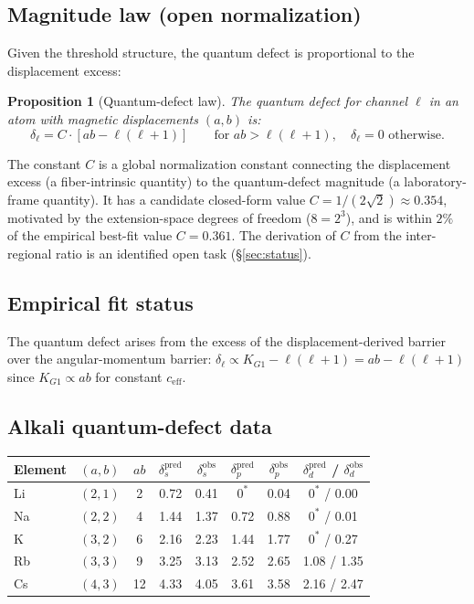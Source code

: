 \documentclass[11pt,a4paper]{article}
\newtheorem{proposition}[theorem]{Proposition}
\begin{document}
\subsection{Magnitude law (open normalization)}

Given the threshold structure, the quantum defect is proportional to the displacement excess:

\begin{proposition}[Quantum-defect law]
\label{prop:qd-law}
The quantum defect for channel $\ell$ in an atom with magnetic displacements $(a, b)$ is:
\[
\delta_\ell = C \cdot [ab - \ell(\ell+1)] \qquad \text{for } ab > \ell(\ell+1), \quad \delta_\ell = 0 \text{ otherwise}.
\]
\end{proposition}

The constant $C$ is a global normalization constant connecting the displacement excess (a fiber-intrinsic quantity) to the quantum-defect magnitude (a laboratory-frame quantity). It has a candidate closed-form value $C = 1/(2\sqrt{2}) \approx 0.354$, motivated by the extension-space degrees of freedom ($8 = 2^3$), and is within $2\%$ of the empirical best-fit value $C = 0.361$. The derivation of $C$ from the inter-regional ratio is an identified open task (\S\ref{sec:status}).

\subsection{Empirical fit status}

The quantum defect arises from the excess of the displacement-derived barrier over the angular-momentum barrier:
$\delta_\ell \propto K_{G1} - \ell(\ell+1) = ab - \ell(\ell+1)$
since $K_{G1} \propto ab$ for constant $c_{\mathrm{eff}}$.

\subsection{Alkali quantum-defect data}

\begin{center}
\renewcommand{\arraystretch}{1.15}
\begin{tabular}{lccccccc}
\toprule
Element & $(a,b)$ & $ab$ & $\delta_s^{\mathrm{pred}}$ & $\delta_s^{\mathrm{obs}}$ & $\delta_p^{\mathrm{pred}}$ & $\delta_p^{\mathrm{obs}}$ & $\delta_d^{\mathrm{pred}}$ / $\delta_d^{\mathrm{obs}}$ \\
\midrule
Li & $(2,1)$ & 2 & 0.72 & 0.41 & $0^*$ & 0.04 & $0^*$ / 0.00 \\
Na & $(2,2)$ & 4 & 1.44 & 1.37 & 0.72 & 0.88 & $0^*$ / 0.01 \\
K  & $(3,2)$ & 6 & 2.16 & 2.23 & 1.44 & 1.77 & $0^*$ / 0.27 \\
Rb & $(3,3)$ & 9 & 3.25 & 3.13 & 2.52 & 2.65 & 1.08 / 1.35 \\
Cs & $(4,3)$ & 12 & 4.33 & 4.05 & 3.61 & 3.58 & 2.16 / 2.47 \\
\bottomrule
\end{tabular}
\end{center}
\end{document}
